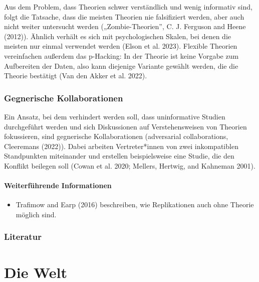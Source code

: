 \documentclass[
  letterpaper,
  DIV=11,
  numbers=noendperiod]{scrreprt}
\providecommand{\tightlist}{%
  \setlength{\itemsep}{0pt}\setlength{\parskip}{0pt}}\usepackage{longtable,booktabs,array}
\begin{document}
Aus dem Problem, dass Theorien schwer verständlich und wenig informativ
sind, folgt die Tatsache, dass die meisten Theorien nie falsifiziert
werden, aber auch nicht weiter untersucht werden („Zombie-Theorien'', C.
J. Ferguson and Heene (2012)). Ähnlich verhält es sich mit
psychologischen Skalen, bei denen die meisten nur einmal verwendet
werden (Elson et al. 2023). Flexible Theorien vereinfachen außerdem das
p-Hacking: In der Theorie ist keine Vorgabe zum Aufbereiten der Daten,
also kann diejenige Variante gewählt werden, die die Theorie bestätigt
(Van den Akker et al. 2022).

\subsection{Gegnerische
Kollaborationen}\label{gegnerische-kollaborationen}

Ein Ansatz, bei dem verhindert werden soll, dass uninformative Studien
durchgeführt werden und sich Diskussionen auf Verstehensweisen von
Theorien fokussieren, sind gegnerische Kollaborationen (adversarial
collaborations, Cleeremans (2022)). Dabei arbeiten Vertreter*innen von
zwei inkompatiblen Standpunkten miteinander und erstellen beispielsweise
eine Studie, die den Konflikt beilegen soll (Cowan et al. 2020; Mellers,
Hertwig, and Kahneman 2001).

\subsubsection{Weiterführende
Informationen}\label{weiterfuxfchrende-informationen-5}

\begin{itemize}
\tightlist
\item
  Trafimow and Earp (2016) beschreiben, wie Replikationen auch ohne
  Theorie möglich sind.
\end{itemize}

\subsection{Literatur}\label{literatur-15}

\chapter{Die Welt}\label{die-welt}
\end{document}
